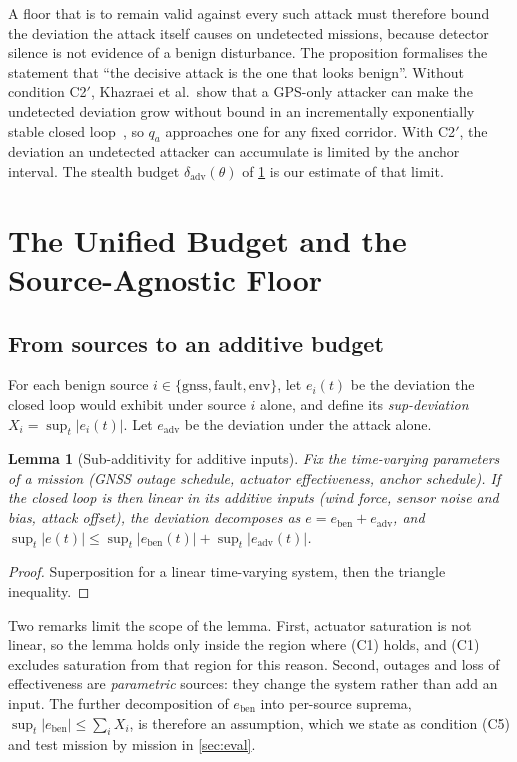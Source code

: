 \documentclass[letterpaper,twocolumn,10pt]{article}
\newcommand{\dadv}{\delta_{\mathrm{adv}}}
\newtheorem{lemma}{Lemma}
\theoremstyle{remark}
\begin{document}
\noindent
A floor that is to remain valid against every such attack must therefore bound
the deviation the attack itself causes on undetected missions, because
detector silence is not evidence of a benign disturbance. The
proposition formalises the statement that ``the decisive attack is the one
that looks benign''. Without condition C2$'$, Khazraei et al.\ show that a
GPS-only attacker can make the undetected deviation grow without bound in an
incrementally exponentially stable closed loop~\cite{khazraei2024}, so $q_a$
approaches one for any fixed corridor. With C2$'$, the deviation an
undetected attacker can accumulate is limited by the anchor interval. The stealth budget
$\dadv(\theta)$ of \cref{sec:budget} is our estimate of that limit.

\section{The Unified Budget and the Source-Agnostic Floor}
\label{sec:budget}
\subsection{From sources to an additive budget}
For each benign source $i\in\{\mathrm{gnss},\mathrm{fault},\mathrm{env}\}$, let
$e_i(t)$ be the deviation the closed loop would exhibit under source $i$ alone,
and define its \emph{sup-deviation} $X_i=\sup_t|e_i(t)|$. Let $e_{\mathrm{adv}}$
be the deviation under the attack alone.

\begin{lemma}[Sub-additivity for additive inputs]
\label{lem:subadd}
Fix the time-varying parameters of a mission (GNSS outage schedule, actuator
effectiveness, anchor schedule). If the closed loop is then linear in its
additive inputs (wind force, sensor noise and bias, attack offset), the
deviation decomposes as $e=e_{\mathrm{ben}}+e_{\mathrm{adv}}$, and
$\sup_t|e(t)|\le\sup_t|e_{\mathrm{ben}}(t)|+\sup_t|e_{\mathrm{adv}}(t)|$.
\end{lemma}
\begin{proof}
Superposition for a linear time-varying system, then the triangle inequality.
\end{proof}

\noindent
Two remarks limit the scope of the lemma. First, actuator saturation is not linear,
so the lemma holds only inside the region where (C1) holds, and (C1) excludes
saturation from that region for this reason.
Second, outages and loss of effectiveness are \emph{parametric} sources: they
change the system rather than add an input. The further decomposition of
$e_{\mathrm{ben}}$ into per-source suprema,
$\sup_t|e_{\mathrm{ben}}|\le\sum_iX_i$, is therefore an assumption, which we
state as condition (C5) and test mission by mission in \cref{sec:eval}.
\end{document}
